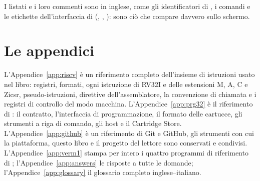 I listati e i loro commenti sono in inglese, come gli identificatori di \prg,
i comandi e le etichette dell'interfaccia di \prgqt (, ,
): sono ciò che compare davvero sullo schermo.

\section*{Le appendici}

L'Appendice~\ref{app:riscv} è un riferimento completo dell'insieme di
istruzioni \riscv usato nel libro: registri, formati, ogni istruzione di RV32I
e delle estensioni M, A, C e Zicsr, pseudo-istruzioni, direttive
dell'assemblatore, la convenzione di chiamata e i registri di controllo del
modo macchina. L'Appendice~\ref{app:prg32} è il riferimento di \prg: il
contratto, l'interfaccia di programmazione, il formato delle cartucce, gli
strumenti a riga di comando, gli host e il Cartridge Store.
L'Appendice~\ref{app:github} è un riferimento di Git e GitHub, gli strumenti
con cui la piattaforma, questo libro e il progetto del lettore sono conservati
e condivisi. L'Appendice~\ref{app:verm1} stampa per intero i quattro programmi
di riferimento di \vermone; l'Appendice~\ref{app:answers} le risposte a tutte
le domande; l'Appendice~\ref{app:glossary} il glossario completo
inglese--italiano.
